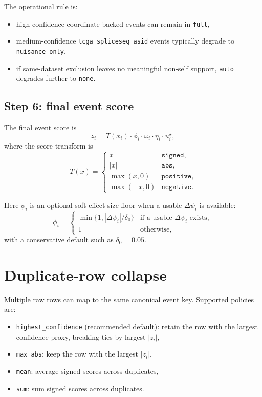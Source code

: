 \documentclass[11pt]{article}
\begin{document}
The operational rule is:
\begin{itemize}[leftmargin=2em]
\item high-confidence coordinate-backed events can remain in \texttt{full},
\item medium-confidence \texttt{tcga\_spliceseq\_asid} events typically degrade to \texttt{nuisance\_only},
\item if same-dataset exclusion leaves no meaningful non-self support, \texttt{auto} degrades further to \texttt{none}.
\end{itemize}

\subsection{Step 6: final event score}
The final event score is
\begin{equation}
z_i = T(x_i) \cdot \phi_i \cdot \omega_i \cdot \eta_i \cdot u_i^\star,
\label{eq:final_event_score}
\end{equation}
where the score transform is
\[
T(x) =
\begin{cases}
x & \texttt{signed},\\
|x| & \texttt{abs},\\
\max(x,0) & \texttt{positive},\\
\max(-x,0) & \texttt{negative}.
\end{cases}
\]

Here $\phi_i$ is an optional soft effect-size floor when a usable $\Delta \psi_i$ is available:
\[
\phi_i =
\begin{cases}
\min\{1, |\Delta \psi_i| / \delta_0\} & \text{if a usable } \Delta \psi_i \text{ exists},\\
1 & \text{otherwise,}
\end{cases}
\]
with a conservative default such as $\delta_0 = 0.05$.

\section{Duplicate-row collapse}
Multiple raw rows can map to the same canonical event key. Supported policies are:
\begin{itemize}[leftmargin=2em]
\item \texttt{highest\_confidence} (recommended default): retain the row with the largest confidence proxy, breaking ties by largest $|z_i|$,
\item \texttt{max\_abs}: keep the row with the largest $|z_i|$,
\item \texttt{mean}: average signed scores across duplicates,
\item \texttt{sum}: sum signed scores across duplicates.
\end{itemize}
\end{document}
